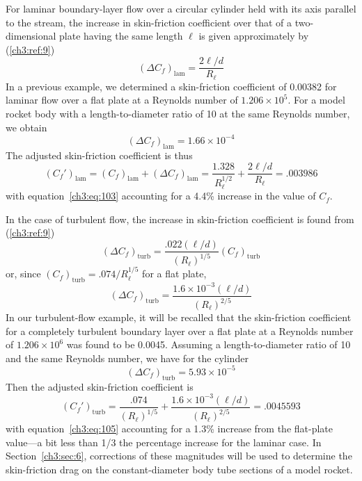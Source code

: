 For laminar boundary-layer flow over a circular cylinder held with its axis
parallel to the stream, the increase in skin-friction coefficient over that of
a two-dimensional plate having the same length $\ell$ is given approximately
by (\ref{ch3:ref:9})
\begin{equation}\label{ch3:eq:103}
(\Delta C_f)_{\mathrm{lam}} = \frac{2\ell/d}{R_\ell}
\end{equation}
In a previous example, we determined a skin-friction coefficient of 0.00382
for laminar flow over a flat plate at a Reynolds number of
$1.206 \times 10^{5}$. For a model rocket body with a length-to-diameter ratio
of 10 at the same Reynolds number, we obtain
\begin{equation*}
(\Delta C_f)_{\mathrm{lam}} = 1.66 \times 10^{-4}
\end{equation*}
The adjusted skin-friction coefficient is thus
\begin{equation*}
(C_f')_{\mathrm{lam}} = (C_f)_{\mathrm{lam}} + (\Delta C_f)_{\mathrm{lam}}
  = \frac{1.328}{R_\ell^{1/2}} + \frac{2\ell/d}{R_\ell} = .003986
\end{equation*}
with equation~\eqref{ch3:eq:103} accounting for a 4.4\% increase in the value
of $C_f$.

In the case of turbulent flow, the increase in skin-friction coefficient is
found from (\ref{ch3:ref:9})
\begin{equation}\label{ch3:eq:104}
(\Delta C_f)_{\mathrm{turb}} = \frac{.022(\ell/d)}{(R_\ell)^{1/5}}(C_f)_{\mathrm{turb}}
\end{equation}
or, since $(C_f)_{\mathrm{turb}} = .074/R_\ell^{1/5}$ for a flat plate,
\begin{equation}\label{ch3:eq:105}
(\Delta C_f)_{\mathrm{turb}} = \frac{1.6 \times 10^{-3}(\ell/d)}{(R_\ell)^{2/5}}
\end{equation}
In our turbulent-flow example, it will be recalled that the skin-friction
coefficient for a completely turbulent boundary layer over a flat plate at a
Reynolds number of $1.206 \times 10^{6}$ was found to be 0.0045. Assuming a
length-to-diameter ratio of 10 and the same Reynolds number, we have for the
cylinder
\begin{equation*}
(\Delta C_f)_{\mathrm{turb}} = 5.93 \times 10^{-5}
\end{equation*}
Then the adjusted skin-friction coefficient is
\begin{equation*}
(C_f')_{\mathrm{turb}} = \frac{.074}{(R_\ell)^{1/5}}
  + \frac{1.6 \times 10^{-3}(\ell/d)}{(R_\ell)^{2/5}} = .0045593
\end{equation*}
with equation~\eqref{ch3:eq:105} accounting for a 1.3\% increase from the
flat-plate value---a bit less than 1/3 the percentage increase for the laminar
case. In Section~\ref{ch3:sec:6}, corrections of these magnitudes will be used
to determine the skin-friction drag on the constant-diameter body tube sections
of a model rocket.


